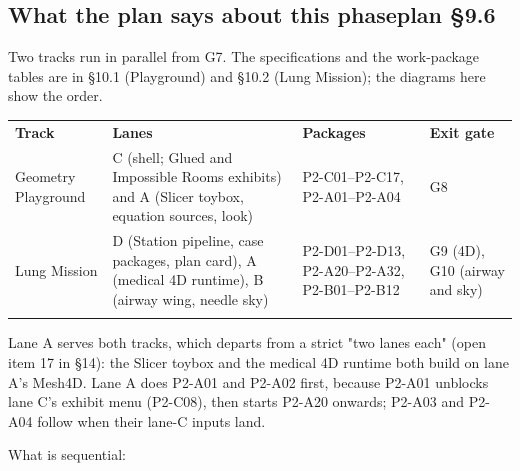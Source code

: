 \documentclass[10pt,a4paper,landscape]{article}
\newcommand{\planmark}[1]{{\normalfont\fontsize{7.5}{9}\selectfont\color{muted}\if\relax\detokenize{#1}\relax\else plan #1\fi}}
\newcommand{\sub}[2]{\subsection[#1]{#1\hfill\planmark{#2}}}
\newcommand{\code}[1]{{\ttfamily #1}}
\newcommand{\tablefont}{\fontsize{8}{10.6}\selectfont}
\newcommand{\thinrule}{\arrayrulecolor{rule}\hline}
\newcommand{\thickrule}{\arrayrulecolor{ink}\hline}
\begin{document}
\sub{What the plan says about this phase}{§9.6}
\begin{quoted}
Two tracks run in parallel from G7. The specifications and the work-package tables are in §10.1 (Playground) and §10.2 (Lung Mission); the diagrams here show the order.\par

{\tablefont\renewcommand{\arraystretch}{1.3}\setlength{\tabcolsep}{2mm}\begin{tabularx}{\linewidth}{@{}>{\RaggedRight\arraybackslash}X >{\RaggedRight\arraybackslash}X >{\RaggedRight\arraybackslash}X >{\RaggedRight\arraybackslash}X@{}}
\rowcolor{panel}\textbf{Track} & \textbf{Lanes} & \textbf{Packages} & \textbf{Exit gate} \\ \thickrule
Geometry Playground & C (shell; Glued and Impossible Rooms exhibits) and A (Slicer toybox, equation sources, look) & \code{P2-\allowbreak{}C01}–\code{P2-\allowbreak{}C17}, \code{P2-\allowbreak{}A01}–\code{P2-\allowbreak{}A04} & G8 \\ \thinrule
Lung Mission & D (Station pipeline, case packages, plan card), A (medical 4D runtime), B (airway wing, needle sky) & \code{P2-\allowbreak{}D01}–\code{P2-\allowbreak{}D13}, \code{P2-\allowbreak{}A20}–\code{P2-\allowbreak{}A32}, \code{P2-\allowbreak{}B01}–\code{P2-\allowbreak{}B12} & G9 (4D), G10 (airway and sky) \\ \thinrule
\end{tabularx}\par}

Lane A serves both tracks, which departs from a strict "two lanes each" (open item 17 in §14): the Slicer toybox and the medical 4D runtime both build on lane A's \code{Mesh4D}. Lane A does \code{P2-\allowbreak{}A01} and \code{P2-\allowbreak{}A02} first, because \code{P2-\allowbreak{}A01} unblocks lane C's exhibit menu (\code{P2-\allowbreak{}C08}), then starts \code{P2-\allowbreak{}A20} onwards; \code{P2-\allowbreak{}A03} and \code{P2-\allowbreak{}A04} follow when their lane-C inputs land.\par

What is sequential:\par


\end{quoted}
\end{document}
